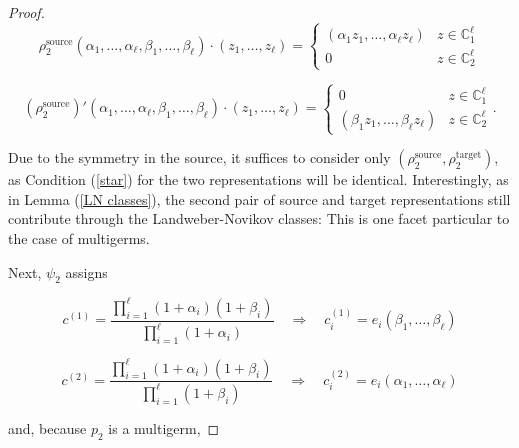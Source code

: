 \documentclass[11pt]{article}
\theoremstyle{plain}
\theoremstyle{definition}
\theoremstyle{definition}
\newcommand{\C}{\mathbb{C}}
\begin{document}
\begin{proof}
\[
\rho_2^{\text{source}}(\alpha_1,\dots,\alpha_\ell,\beta_1,\dots,\beta_\ell)\cdot (z_1,\dots,z_\ell) = \begin{cases}
(\alpha_1 z_1,\dots,\alpha_\ell z_\ell) & z\in \C^\ell_1\\
0 & z \in \C^\ell_2
\end{cases}
\]

\[
(\rho_2^{\text{source}})'(\alpha_1,\dots,\alpha_\ell,\beta_1,\dots,\beta_\ell)\cdot (z_1,\dots,z_\ell) = \begin{cases}
0 & z \in \C^\ell_1\\
(\beta_1 z_1,\dots,\beta_\ell z_\ell) & z\in \C^\ell_2
\end{cases}.
\]

Due to the symmetry in the source, it suffices to consider only $(\rho_2^{\text{source}},\rho_2^{\text{target}})$, as Condition (\ref{star}) for the two representations will be identical. Interestingly, as in Lemma (\ref{LN classes}), the second pair of source and target representations still contribute through the Landweber-Novikov classes: This is one facet particular to the case of multigerms.

Next, $\psi_2$ assigns

\[
c^{(1)}=\frac{\prod_{i=1}^{\ell}(1+\alpha_i)(1+\beta_i)}{\prod_{i=1}^{\ell}(1+\alpha_i)}\quad \Rightarrow \quad c_i^{(1)} = e_i(\beta_1,\dots,\beta_\ell)
\]

\[
c^{(2)}=\frac{\prod_{i=1}^{\ell}(1+\alpha_i)(1+\beta_i)}{\prod_{i=1}^{\ell}(1+\beta_i)}\quad \Rightarrow \quad c_i^{(2)} = e_i(\alpha_1,\dots,\alpha_\ell)
\]

and, because $p_2$ is a multigerm,


\end{proof}
\end{document}
